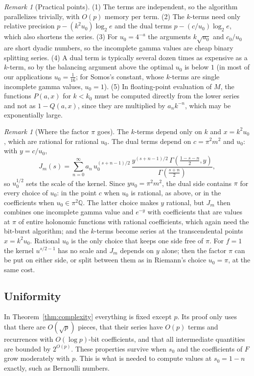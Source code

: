 \documentclass[11pt,reqno]{amsart}
\theoremstyle{definition}
\theoremstyle{remark}
\newtheorem{remark}[theorem]{Remark}
\newcommand{\QQ}{\mathbb{Q}}
\begin{document}
\begin{remark}[Practical points]\label{rem:practical}
(1) The terms are independent, so the algorithm parallelizes trivially, with $O(p)$ memory per term. (2) The
$k$-terms need only relative precision $p - (k^2u_0)\log_2 e$ and the dual terms $p - (c/u_0)\log_2e$, which also
shortens the series. (3) For $u_0 = 4^{-a}$ the arguments $k\sqrt{u_0}$ and $c_0/u_0$ are short dyadic numbers, so the
incomplete gamma values are cheap binary splitting series. (4) A dual term is typically several dozen times as
expensive as a $k$-term, so by the balancing argument above the optimal $u_0$ is below $1$ (in most of our applications
$u_0 = \frac1{16}$; for Somos's constant, whose $k$-terms are single incomplete gamma values, $u_0 = 1$). (5) In
floating-point evaluation of $M$, the functions $P(a,x)$ for $k < k_0$ must be computed directly from the lower
series and not as $1 - Q(a,x)$, since they are multiplied by $a_nk^{-n}$, which may be exponentially large.
\end{remark}

\begin{remark}[Where the factor $\pi$ goes]\label{rem:wherepi}
The $k$-terms depend only on $k$ and $x = k^2u_0$, which are rational for rational $u_0$. The dual terms depend on
$c = \pi^2m^2$ and $u_0$: with $y = c/u_0$,
\[
  J_m(s) = \sum_{n=0}^{\infty}a_n\,u_0^{(s+n-1)/2}\,\frac{y^{(s+n-1)/2}\,\Gamma(\frac{1-s-n}2, y)}{\Gamma(\frac{s+n}2)},
\]
so $u_0^{1/2}$ sets the scale of the kernel. Since $yu_0 = \pi^2m^2$, the dual side contains $\pi$ for every choice
of $u_0$: in the point $c$ when $u_0$ is rational, as above, or in the coefficients when $u_0 \in \pi^2\QQ$. The latter
choice makes $y$ rational, but $J_m$ then combines one incomplete gamma value and $e^{-y}$ with coefficients that are
values at $\pi$ of entire holonomic functions with rational coefficients, which again need the bit-burst algorithm;
and the $k$-terms become series at the transcendental points $x = k^2u_0$. Rational $u_0$ is the only choice that
keeps one side free of $\pi$. For $f = 1$ the kernel $u^{s/2-1}$ has no scale and $J_m$ depends on $y$ alone; then
the factor $\pi$ can be put on either side, or split between them as in Riemann's choice $u_0 = \pi$, at the same
cost.
\end{remark}

\subsection{Uniformity}\label{sec:uniform}
In Theorem~\ref{thm:complexity} everything is fixed except $p$. Its proof only uses that there are $O(\sqrt p)$
pieces, that their series have $O(p)$ terms and recurrences with $O(\log p)$-bit coefficients, and that all
intermediate quantities are bounded by $2^{O(p)}$. These properties survive when $s_0$ and the coefficients of $F$
grow moderately with $p$. This is what is needed to compute values at $s_0 = 1 - n$ exactly, such as Bernoulli numbers.
\end{document}
